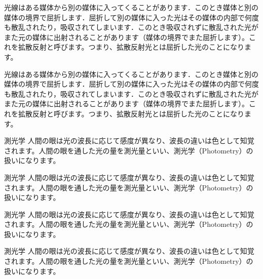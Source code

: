 \documentclass[../main]{subfiles}
\begin{document}
\leaderfill

\begin{NOTE}[拡散反射光]
    光線はある媒体から別の媒体に入ってくることがあります．このとき媒体と別の媒体の境界で屈折します．屈折して別の媒体に入った光はその媒体の内部で何度も散乱されたり，吸収されてしまいます．このとき吸収されずに散乱された光がまた元の媒体に出射されることがあります（媒体の境界でまた屈折します）。これを拡散反射と呼びます。つまり、拡散反射光とは屈折した光のことになります。
\end{NOTE}
\begin{code}[language=tex]
\begin{NOTE}[拡散反射光]
    光線はある媒体から別の媒体に入ってくることがあります．このとき媒体と別の媒体の境界で屈折します．屈折して別の媒体に入った光はその媒体の内部で何度も散乱されたり，吸収されてしまいます．このとき吸収されずに散乱された光がまた元の媒体に出射されることがあります（媒体の境界でまた屈折します）。これを拡散反射と呼びます。つまり、拡散反射光とは屈折した光のことになります。
\end{NOTE}
\end{code}

\begin{CTNOTEBLUE}{測光学}
    人間の眼は光の波長に応じて感度が異なり、波長の違いは色として知覚されます。人間の眼を通した光の量を測光量といい、測光学（Photometry）の扱いになります。
\end{CTNOTEBLUE}
\begin{code}[language=tex]
\begin{CTNOTEBLUE}{測光学}
    人間の眼は光の波長に応じて感度が異なり、波長の違いは色として知覚されます。人間の眼を通した光の量を測光量といい、測光学（Photometry）の扱いになります。
\end{CTNOTEBLUE}
\end{code}

\begin{CTNOTERED}{測光学}
    人間の眼は光の波長に応じて感度が異なり、波長の違いは色として知覚されます。人間の眼を通した光の量を測光量といい、測光学（Photometry）の扱いになります。
\end{CTNOTERED}
\begin{code}[language=tex]
\begin{CTNOTERED}{測光学}
    人間の眼は光の波長に応じて感度が異なり、波長の違いは色として知覚されます。人間の眼を通した光の量を測光量といい、測光学（Photometry）の扱いになります。
\end{CTNOTERED}
\end{code}
\end{document}
